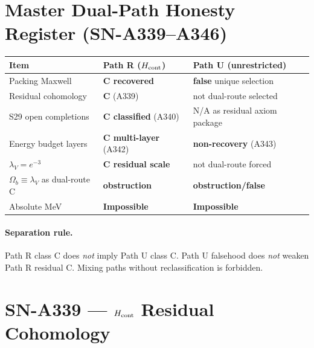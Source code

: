 
\section*{Master Dual-Path Honesty Register (SN-A339--A346)}
\begin{center}
\begin{tabular}{@{}p{3.2cm}p{4.4cm}p{4.6cm}@{}}
\toprule
\textbf{Item} & \textbf{Path R ($H_{\rm cont}$)} & \textbf{Path U (unrestricted)} \\
\midrule
Packing Maxwell & \textbf{C recovered} & \textbf{false} unique selection \\
Residual cohomology & \textbf{C} (A339) & not dual-route selected \\
S29 open completions & \textbf{C classified} (A340) & N/A as residual axiom package \\
Energy budget layers & \textbf{C multi-layer} (A342) & \textbf{non-recovery} (A343) \\
$\lambda_V=e^{-3}$ & \textbf{C residual scale} & not dual-route forced \\
$\Omega_b\equiv\lambda_V$ as dual-route C & \textbf{obstruction} & \textbf{obstruction/false} \\
Absolute MeV & \textbf{Impossible} & \textbf{Impossible} \\
\bottomrule
\end{tabular}
\end{center}

\paragraph{Separation rule.}
Path R class C does \emph{not} imply Path U class C.
Path U falsehood does \emph{not} weaken Path R residual C.
Mixing paths without reclassification is forbidden.

\section{SN-A339 --- $H_{\rm cont}$ Residual Cohomology}
\label{sec:SN-A339}


